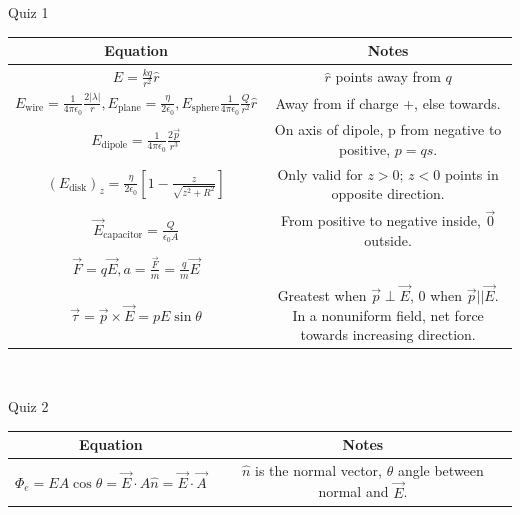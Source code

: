 \documentclass{article}
\begin{document}
\begin{center}
	\begin{section}{Quiz 1}
	 \begin{tabular}{|c|c|}
		 \hline Equation                                                            & Notes                                                                     \\
		 \hline
		 $E = \frac{kq}{r^2} \hat r$                                                & $\hat r$ points away from $q$                                             \\
		 $E_\text{wire} = \frac{1}{4 \pi \epsilon_0} \frac{2 | \lambda |}{r},
			 E_\text{plane} = \frac{\eta}{2 \epsilon_0},

		 E_\text{sphere} \frac{1}{4 \pi \epsilon_0} \frac{Q}{r^2} \hat r $          & Away from if charge +, else towards.                                      \\

		 $E_\text{dipole} = \frac{1}{4 \pi \epsilon_0} \frac{2 \vec p}{r^3}$        & On axis of dipole, p from negative to positive, $p = qs$.                 \\

		 $(E_\text{disk})_z
		 = \frac{\eta}{2 \epsilon_0} \left[ 1 - \frac{z}{\sqrt{z^2 + R^2}} \right]$ & Only valid for $z > 0$; $z < 0$ points in opposite direction.             \\

		 $\vec E_\text{capacitor} = \frac{Q}{\epsilon_0 A}$                         & From positive to negative inside, $\vec 0$ outside.                       \\


		 $\vec F = q \vec E, a = \frac{ \vec F}{m} = \frac{q}{m} \vec E$            &                                                                           \\

		 $\vec \tau = \vec p \times \vec E = pE \sin \theta $                       & \makecell{Greatest when $\vec p \perp \vec E$, 0 when $\vec p || \vec E$. \\
		 In a nonuniform field, net force towards increasing direction.}                                                                                        \\

		 \hline
	 \end{tabular}
	 \\
	\end{section}
	\begin{section}{Quiz 2}
	 \begin{tabular}{|c|c|}
		 \hline Equation                                                                 & Notes                                                                      \\
		 \hline $\Phi_e = E A \cos \theta = \vec E \cdot A \hat n = \vec E \cdot \vec A$ & $\hat n$ is the normal vector, $\theta$ angle between normal and $\vec E$. \\



\end{tabular}
\end{section}
\end{center}
\end{document}
